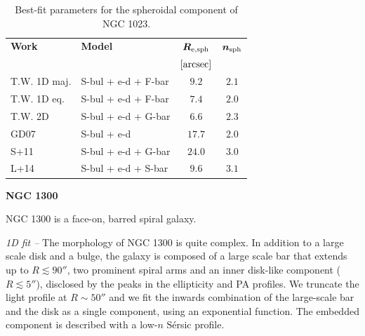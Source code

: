 \documentclass[preprint2]{emulateapj}
\begin{document}
  \begin{table}[h]
  \small
  \caption{Best-fit parameters for the spheroidal component of NGC 1023.}
  \begin{center}
  \begin{tabular}{llcc}
  \hline
  {\bf Work} & {\bf Model}   & $\bm R_{\rm e,sph}$    & $\bm n_{\rm sph}$ \\
    &  &  $[\rm arcsec]$ & \\
  \hline
  T.W. 1D maj. & S-bul + e-d + F-bar & $9.2$  &  $2.1$ \\
  T.W. 1D eq.  & S-bul + e-d + F-bar & $7.4$  &  $2.0$ \\
  T.W. 2D      & S-bul + e-d + G-bar & $6.6$  &  $2.3$ \\
  \hline
  GD07    & S-bul + e-d 	& $17.7$  &  $2.0$ \\
  S+11    & S-bul + e-d + G-bar & $24.0$  &  $3.0$ \\
  L+14    & S-bul + e-d + S-bar & $9.6$   &  $3.1$ \\
  \hline
  \end{tabular}
  \end{center}
  \label{tab:n1023}
  \end{table}



  \clearpage\newpage\noindent
  {\bf NGC 1300 \\}

  NGC 1300 is a face-on, barred spiral galaxy. %


  \emph{1D fit -- }
  The morphology of NGC 1300 is quite complex. 
  In addition to a large scale disk and a bulge, the galaxy is composed of 
  a large scale bar that extends up to $R \lesssim 90''$, two prominent spiral arms 
  and an inner disk-like component ($R \lesssim 5''$), disclosed by the peaks in the ellipticity and PA profiles.
  We truncate the light profile at $R \sim 50''$ and we fit the inwards combination of the large-scale bar and the disk 
  as a single component, using an exponential function.
  The embedded component is described with a low-$n$ S\'ersic profile.
\end{document}
